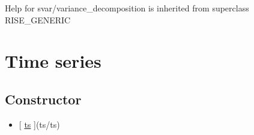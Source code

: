 \documentclass[letterpaper,10pt,english]{sphinxmanual}
\begin{document}
Help for svar/variance\_decomposition is inherited from superclass RISE\_GENERIC


\chapter{Time series}
\label{classes/time_series/@ts/ts:time-series}\label{classes/time_series/@ts/ts::doc}

\section{Constructor}
\label{classes/time_series/@ts/ts:constructor}\begin{itemize}
\item {} 
{[} {\hyperref[classes/time_series/@ts/ts:ts]{ts}} {]}(ts/ts)

\end{itemize}
\end{document}
